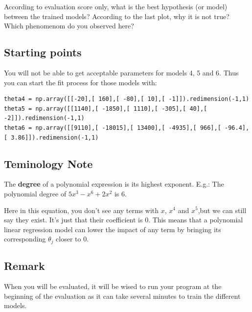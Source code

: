 \documentclass{42-en}
\begin{document}
According to evaluation score only, what is the best hypothesis (or model) between the trained models?
According to the last plot, why it is not true?
Which phenomenom do you observed here?

\subsection*{Starting points}
You will not be able to get acceptable parameters for models 4, 5 and 6.
Thus you can start the fit process for those models with:

\begin{verbatim}
theta4 = np.array([[-20],[ 160],[ -80],[ 10],[ -1]]).redimension(-1,1)
theta5 = np.array([[1140],[ -1850],[ 1110],[ -305],[ 40],[ -2]]).redimension(-1,1)
theta6 = np.array([[9110],[ -18015],[ 13400],[ -4935],[ 966],[ -96.4],[ 3.86]]).redimension(-1,1)
\end{verbatim}

\subsection*{Teminology Note}
The \textbf{degree} of a polynomial expression is its highest exponent.  
E.g.: The polynomial degree of $5x^3 - x^6 + 2 x^2$ is $6$.  


Here in this equation, you don't see any terms with $x$, $x^4$ and $x^5$,but we can still say they exist. It's just that their coefficient is $0$.
This means that a polynomial linear regression model can lower the impact of any term by bringing its corresponding $\theta_j$ closer to $0$.

\subsection*{Remark}
When you will be evaluated, it will be wised to run your program at the beginning of the evaluation as it can take several minutes to train the different models.


\newpage

\end{document}
